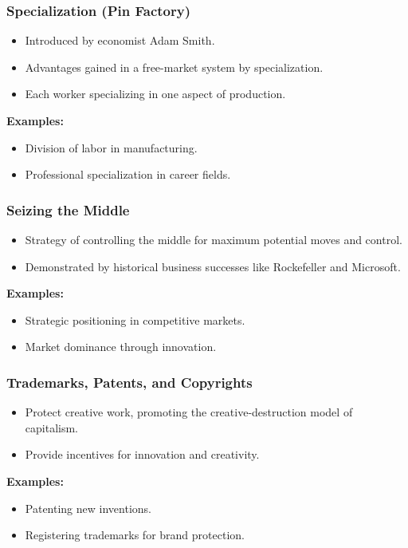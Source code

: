 \begin{frame}[fragile]\frametitle{Specialization (Pin Factory)}
\begin{itemize}
    \item Introduced by economist Adam Smith.
    \item Advantages gained in a free-market system by specialization.
    \item Each worker specializing in one aspect of production.
\end{itemize}
\textbf{Examples:}
\begin{itemize}
    \item Division of labor in manufacturing.
    \item Professional specialization in career fields.
\end{itemize}
\end{frame}

\begin{frame}[fragile]\frametitle{Seizing the Middle}
\begin{itemize}
    \item Strategy of controlling the middle for maximum potential moves and control.
    \item Demonstrated by historical business successes like Rockefeller and Microsoft.
\end{itemize}
\textbf{Examples:}
\begin{itemize}
    \item Strategic positioning in competitive markets.
    \item Market dominance through innovation.
\end{itemize}
\end{frame}

\begin{frame}[fragile]\frametitle{Trademarks, Patents, and Copyrights}
\begin{itemize}
    \item Protect creative work, promoting the creative-destruction model of capitalism.
    \item Provide incentives for innovation and creativity.
\end{itemize}
\textbf{Examples:}
\begin{itemize}
    \item Patenting new inventions.
    \item Registering trademarks for brand protection.
\end{itemize}
\end{frame}

